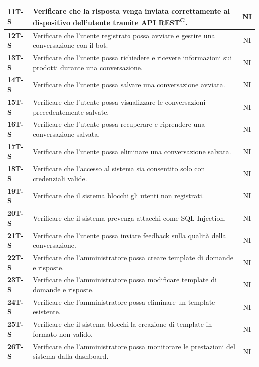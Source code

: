 \documentclass{article}
\begin{document}
\begin{longtable}{|>{\centering\arraybackslash}m{}|>{\raggedright\arraybackslash}m{}|c|}
    \hline
    \textbf{11T-S} & Verificare che la risposta venga inviata correttamente al dispositivo dell’utente tramite \href{https://code7crusaders.github.io/docs/RTB/documentazione_interna/glossario.html#api-rest-representational-state-transfer}{API REST\textsuperscript{G}}. & NI \\
    \hline
    \textbf{12T-S} & Verificare che l’utente registrato possa avviare e gestire una conversazione con il bot. & NI \\
    \hline
    \textbf{13T-S} & Verificare che l’utente possa richiedere e ricevere informazioni sui prodotti durante una conversazione. & NI \\
    \hline
    \textbf{14T-S} & Verificare che l’utente possa salvare una conversazione avviata. & NI \\
    \hline
    \textbf{15T-S} & Verificare che l’utente possa visualizzare le conversazioni precedentemente salvate. & NI \\
    \hline
    \textbf{16T-S} & Verificare che l’utente possa recuperare e riprendere una conversazione salvata. & NI \\
    \hline
    \textbf{17T-S} & Verificare che l’utente possa eliminare una conversazione salvata. & NI \\
    \hline
    \textbf{18T-S} & Verificare che l’accesso al sistema sia consentito solo con credenziali valide. & NI \\
    \hline
    \textbf{19T-S} & Verificare che il sistema blocchi gli utenti non registrati. & NI \\
    \hline
    \textbf{20T-S} & Verificare che il sistema prevenga attacchi come SQL Injection. & NI \\
    \hline
    \textbf{21T-S} & Verificare che l’utente possa inviare feedback sulla qualità della conversazione. & NI \\
    \hline
    \textbf{22T-S} & Verificare che l’amministratore possa creare template di domande e risposte. & NI \\
    \hline
    \textbf{23T-S} & Verificare che l’amministratore possa modificare template di domande e risposte. & NI \\
    \hline
    \textbf{24T-S} & Verificare che l’amministratore possa eliminare un template esistente. & NI \\
    \hline
    \textbf{25T-S} & Verificare che il sistema blocchi la creazione di template in formato non valido. & NI \\
    \hline
    \textbf{26T-S} & Verificare che l’amministratore possa monitorare le prestazioni del sistema dalla dashboard. & NI \\

\end{longtable}
\end{document}

